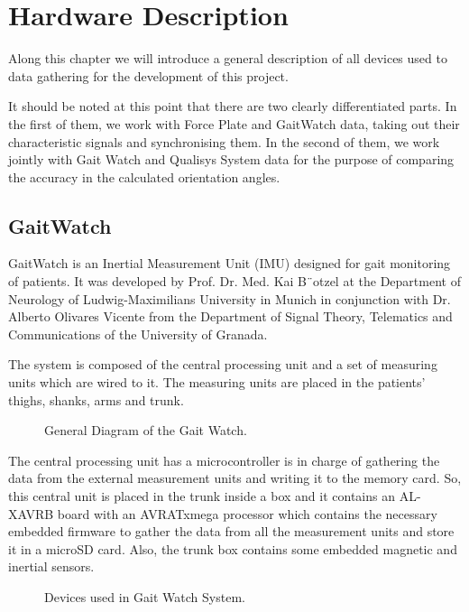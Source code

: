 \chapter{Hardware Description}
\label{ch:Hardware}
Along this chapter we will introduce a general description of all devices used to data gathering for the development of this project.


It should be noted at this point that there are two clearly differentiated parts. In the first of them, we work with Force Plate and GaitWatch data, taking out their characteristic signals and synchronising them. In the second of them, we work jointly with Gait Watch and Qualisys System data for the purpose of comparing the accuracy in the calculated orientation angles.


\section{GaitWatch}

GaitWatch is an Inertial Measurement Unit (IMU) designed for gait monitoring of patients. It was developed by Prof. Dr. Med. Kai B¨otzel at the Department of Neurology of Ludwig-Maximilians University in Munich in conjunction with Dr. Alberto Olivares Vicente from the Department of Signal Theory, Telematics and Communications of the University of Granada. \cite{OlivaresBotzel2013}

The system is composed of the central processing unit and
a set of measuring units which are wired to it. The measuring units are 
placed in the patients’ thighs, shanks, arms and trunk.

\begin{figure}[H]
	\centering
	\caption{General Diagram of the Gait Watch.}
	\label{fig:arte1}
\end{figure}

The central processing unit has a microcontroller is in charge of gathering the data from the external measurement units and writing it to the memory card. So, this central unit is placed in the trunk inside a box and it contains an AL-XAVRB board with an AVRATxmega processor which contains the necessary embedded firmware to gather the data from all the measurement units and store it in a microSD card. Also, the trunk box contains some embedded magnetic and inertial sensors.

\begin{figure}[H]
	\centering
	\caption{Devices used in Gait Watch System.}
	\label{fig:arte1}
\end{figure}

